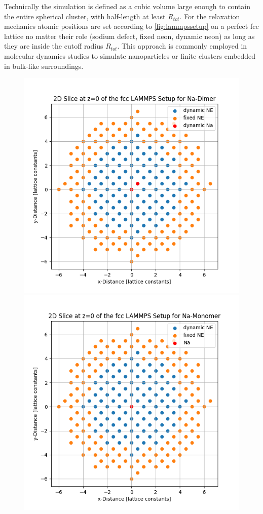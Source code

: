 Technically the simulation is defined as a cubic volume large enough to contain the entire spherical cluster, with half-length at least $R_{tot}$.
For the relaxation mechanics atomic positions are set according to \ref{fig:lammpssetup} on a perfect \ac{fcc} lattice no matter their role (sodium defect, fixed neon, dynamic neon) as long as they are inside the cutoff radius $R_{tot}$.
This approach is commonly employed in molecular dynamics studies to simulate nanoparticles or finite clusters embedded in bulk-like surroundings.
\begin{figure}[h!]
	\centering
	\includegraphics[scale=0.45]{Inhalt/Bilder/lammps_dimer_setup.png}
	\includegraphics[scale=0.45]{Inhalt/Bilder/lammps_mono_setup.png}

\end{figure}

